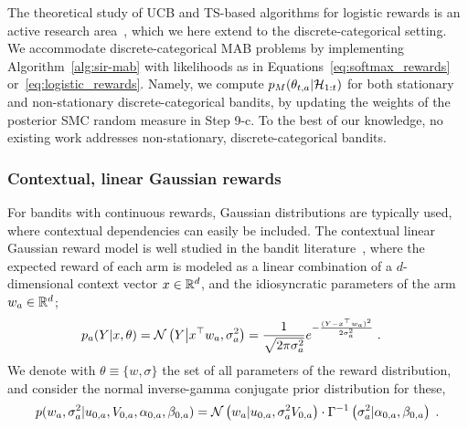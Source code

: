 The theoretical study of UCB and TS-based algorithms for logistic rewards is an active research area~\citep{ip-Dong2019,ip-Faury2020},
which we here extend to the discrete-categorical setting.
%
We accommodate discrete-categorical MAB problems by implementing Algorithm~\ref{alg:sir-mab}
with likelihoods as in Equations~\eqref{eq:softmax_rewards} or~\eqref{eq:logistic_rewards}.
Namely, we compute $p_M(\theta_{t,a}|\mathcal{H}_{1:t})$ 
for both stationary and non-stationary discrete-categorical bandits,
by updating the weights of the posterior SMC random measure in Step 9-c.
To the best of our knowledge,
no existing work addresses non-stationary, discrete-categorical bandits.

\subsubsection{Contextual, linear Gaussian rewards}
\label{sssec:linear_gaussian_rewards}

For bandits with continuous rewards, Gaussian distributions are typically used,
where contextual dependencies can easily be included.
The contextual linear Gaussian reward model is well studied in the bandit literature~\citep{ic-Abbasi-Yadkori2011,ip-Chu2011,ip-Agrawal2013a},
where the expected reward of each arm is modeled as a linear combination of a $d$-dimensional context vector $x\in{\mathbb R}^{d}$,
and the idiosyncratic parameters of the arm $w_a\in{\mathbb R}^{d}$; \ie
\begin{equation}
\begin{split}
p_a(Y|x,\theta)&=\mathcal{N}\left( Y \middle|x^\top w_a, \sigma_a^2\right) =\frac{1}{\sqrt{2\pi\sigma_a^2}}e^{-\frac{(Y-x^\top w_a)^2}{2\sigma_a^2}} \; .
\end{split}
\end{equation}
We denote with $\theta\equiv\{w, \sigma\}$ the set of all parameters of the reward distribution,
and consider the normal inverse-gamma conjugate prior distribution for these, 
\begin{equation}
\begin{split}
p(w_a, \sigma_a^2|u_{0,a}, V_{0,a}, \alpha_{0,a}, \beta_{0,a})
& = \mathcal{N}\left( w_a|u_{0,a}, \sigma_a^2 V_{0,a}\right) \cdot \Gamma^{-1}\left( \sigma_a^2|\alpha_{0,a}, \beta_{0,a}\right) \; .\\
\end{split}
\end{equation}

